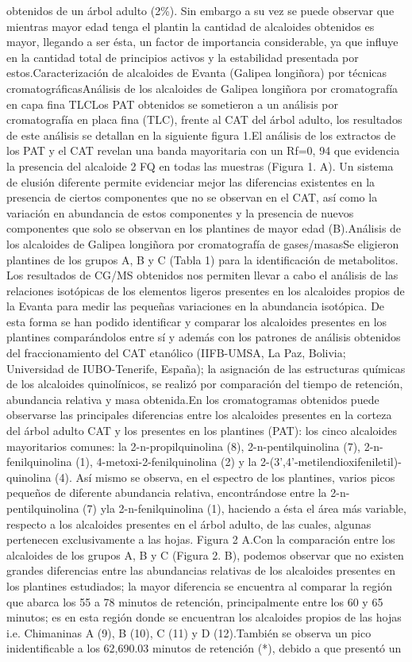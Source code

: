 obtenidos de un árbol adulto (2\%). Sin embargo a su vez se puede observar que mientras mayor edad tenga el plantin la cantidad de alcaloides obtenidos es mayor, llegando a ser ésta, un factor de importancia considerable, ya que influye en la cantidad total de principios activos y la estabilidad presentada por estos.Caracterización de alcaloides de Evanta (Galipea longiñora) por técnicas cromatográficasAnálisis de los alcaloides de Galipea longiñora por cromatografía en capa fina TLCLos PAT obtenidos se sometieron a un análisis por cromatografía en placa fina (TLC), frente al CAT del árbol adulto, los resultados de este análisis se detallan en la siguiente figura 1.El análisis de los extractos de los PAT y el CAT revelan una banda mayoritaria con un Rf=0, 94 que evidencia la presencia del alcaloide 2 FQ en todas las muestras (Figura 1. A). Un sistema de elusión diferente permite evidenciar mejor las diferencias existentes en la presencia de ciertos componentes que no se observan en el CAT, así como la variación en abundancia de estos componentes y la presencia de nuevos componentes que solo se observan en los plantines de mayor edad (B).Análisis de los alcaloides de Galipea longiñora por cromatografía de gases/masasSe eligieron plantines de los grupos A, B y C (Tabla 1) para la identificación de metabolitos. Los resultados de CG/MS obtenidos nos permiten llevar a cabo el análisis de las relaciones isotópicas de los elementos ligeros presentes en los alcaloides propios de la Evanta para medir las pequeñas variaciones en la abundancia isotópica. De esta forma se han podido identificar y comparar los alcaloides presentes en los plantines comparándolos entre sí y además con los patrones de análisis obtenidos del fraccionamiento del CAT etanólico (IIFB-UMSA, La Paz, Bolivia; Universidad de IUBO-Tenerife, España); la asignación de las estructuras químicas de los alcaloides quinolínicos, se realizó por comparación del tiempo de retención, abundancia relativa y masa obtenida.En los cromatogramas obtenidos puede observarse las principales diferencias entre los alcaloides presentes en la corteza del árbol adulto CAT y los presentes en los plantines (PAT): los cinco alcaloides mayoritarios comunes: la 2-n-propilquinolina (8), 2-n-pentilquinolina (7), 2-n-fenilquinolina (1), 4-metoxi-2-fenilquinolina (2) y la 2-(3',4'-metilendioxifeniletil)-quinolina (4). Así mismo se observa, en el espectro de los plantines, varios picos pequeños de diferente abundancia relativa, encontrándose entre la 2-n-pentilquinolina (7) yla 2-n-fenilquinolina (1), haciendo a ésta el área más variable, respecto a los alcaloides presentes en el árbol adulto, de las cuales, algunas pertenecen exclusivamente a las hojas. Figura 2 A.Con la comparación entre los alcaloides de los grupos A, B y C (Figura 2. B), podemos observar que no existen grandes diferencias entre las abundancias relativas de los alcaloides presentes en los plantines estudiados; la mayor diferencia se encuentra al comparar la región que abarca los 55 a 78 minutos de retención, principalmente entre los 60 y 65 minutos; es en esta región donde se encuentran los alcaloides propios de las hojas i.e. Chimaninas A (9), B (10), C (11) y D (12).También se observa un pico inidentificable a los 62,690.03 minutos de retención (*), debido a que presentó un 